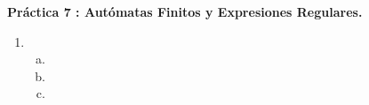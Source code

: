 \documentclass{article}
\begin{document}
\begin{center}
\large \textbf{Práctica 7 : Autómatas Finitos y Expresiones Regulares. }
\end{center}
\begin{enumerate}[1.]
  \item
    \begin{enumerate}[a)]
      \item
      \item
      \item
    \end{enumerate}
\end{enumerate}
\end{document}
